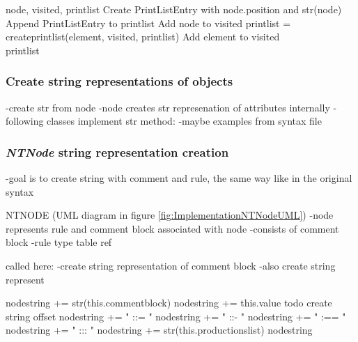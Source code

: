 \begin{algorithm}[H]
\caption{Output Algorithm: create\textunderscore print\textunderscore list}\label{alg:OutputCreatePrintList}
\begin{algorithmic}[1] 
\Require node, visited, print\textunderscore list
\State Create PrintListEntry with node.position and str(node)
\State Append PrintListEntry to print\textunderscore list
\State Add node to visited
			\State print\textunderscore list = create\textunderscore print\textunderscore list(element, visited, print\textunderscore list)
			\State Add element to visited
		\EndIf
	\EndFor
\EndFor \\
\Return print\textunderscore list
\end{algorithmic}
\end{algorithm}

\subsubsection{Create string representations of objects}\label{sec:ImplementationOutputGrammarGraphStringRepresentations}
-create str from node
-node creates str represenation of attributes internally
-following classes implement str method:
-maybe examples from syntax file

\subsubsection{\textit{NTNode} string representation creation}
-goal is to create string with comment and rule, the same way like in the original syntax

NTNODE (UML diagram in figure \ref{fig:ImplementationNTNodeUML})
-node represents rule and comment block associated with node
-consists of comment block
-rule type table ref

called here:
-create string representation of comment block
-also create string represent

\begin{algorithm}[H]
\caption{\textit{NTNode} string creation}\label{alg:OutputCreateNodeString}
\begin{algorithmic}[1] 
	\State node\textunderscore string += str(this.comment\textunderscore block)
\EndIf
\State node\textunderscore string += this.value
\State todo create string offset
	\State node\textunderscore string += " ::= "
	\State node\textunderscore string += " ::- "
	\State node\textunderscore string += " :== "
	\State node\textunderscore string += " ::: "
\EndIf
\State node\textunderscore string += str(this.productions\textunderscore list)
\Return node\textunderscore string
\end{algorithmic}
\end{algorithm}

